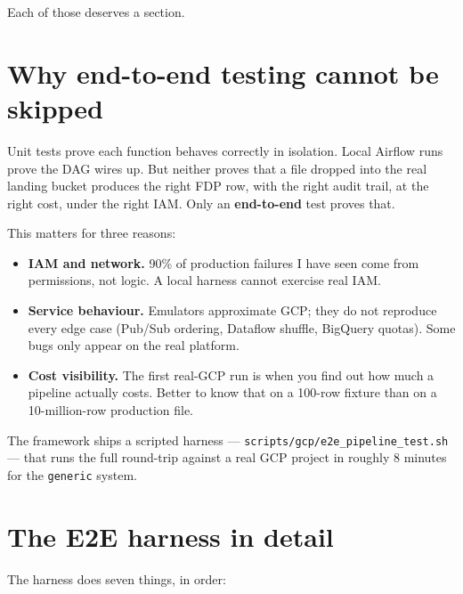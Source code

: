 \documentclass[
  11pt,
  british,
  oneside]{book}
\providecommand{\tightlist}{%
  \setlength{\itemsep}{0pt}\setlength{\parskip}{0pt}}
\begin{document}
Each of those deserves a section.

\hypertarget{why-end-to-end-testing-cannot-be-skipped}{%
\section{Why end-to-end testing cannot be
skipped}\label{why-end-to-end-testing-cannot-be-skipped}}

Unit tests prove each function behaves correctly in isolation. Local
Airflow runs prove the DAG wires up. But neither proves that a file
dropped into the real landing bucket produces the right FDP row, with
the right audit trail, at the right cost, under the right IAM. Only an
\textbf{end-to-end} test proves that.

This matters for three reasons:

\begin{itemize}
\tightlist
\item
  \textbf{IAM and network.} 90\% of production failures I have seen come
  from permissions, not logic. A local harness cannot exercise real IAM.
\item
  \textbf{Service behaviour.} Emulators approximate GCP; they do not
  reproduce every edge case (Pub/Sub ordering, Dataflow shuffle,
  BigQuery quotas). Some bugs only appear on the real platform.
\item
  \textbf{Cost visibility.} The first real-GCP run is when you find out
  how much a pipeline actually costs. Better to know that on a 100-row
  fixture than on a 10-million-row production file.
\end{itemize}

The framework ships a scripted harness ---
\texttt{scripts/gcp/e2e\_pipeline\_test.sh} --- that runs the full
round-trip against a real GCP project in roughly 8 minutes for the
\texttt{generic} system.

\hypertarget{the-e2e-harness-in-detail}{%
\section{The E2E harness in detail}\label{the-e2e-harness-in-detail}}

The harness does seven things, in order:
\end{document}
